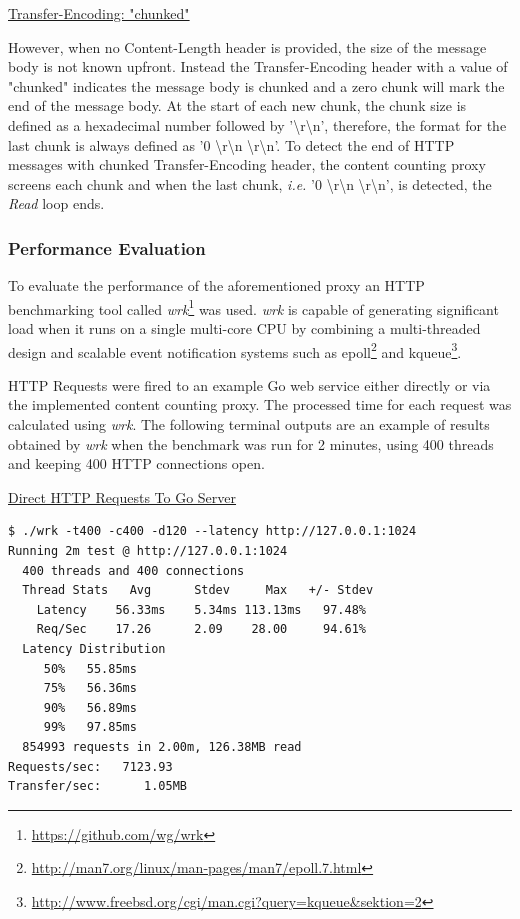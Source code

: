 \documentclass[a4paper,11pt,twoside]{report}
\begin{document}
\noindent
\underline{Transfer-Encoding: "chunked"}\medskip

\noindent
However, when no Content-Length header is provided, the size of the message body is not known upfront. Instead the Transfer-Encoding header with a value of "chunked" indicates the message body is chunked and a zero chunk will mark the end of the message body.  At the start of each new chunk, the chunk size is defined as a hexadecimal number followed by '\textbackslash r\textbackslash n', therefore, the format for the last chunk is always defined as '0 \textbackslash r\textbackslash n \textbackslash r\textbackslash n'. To detect the end of HTTP messages with chunked Transfer-Encoding header, the content counting proxy screens each chunk and when the last chunk, \textit{i.e.} '0 \textbackslash r\textbackslash n \textbackslash r\textbackslash n', is detected, the  \textit{Read} loop ends. 

\subsubsection*{Performance Evaluation}
To evaluate the performance of the aforementioned proxy an HTTP benchmarking tool called \textit{wrk}\footnote{\label{wrk} \url{https://github.com/wg/wrk}} was used. \textit{wrk} is capable of generating significant load when it runs on a single multi-core CPU by combining a multi-threaded design and scalable event notification systems such as epoll\footnote{\label{epoll} \url{http://man7.org/linux/man-pages/man7/epoll.7.html}} and kqueue\footnote{\label{kqueue} \url{http://www.freebsd.org/cgi/man.cgi?query=kqueue&sektion=2}}.



HTTP Requests were fired to an example Go web service either directly or via the implemented content counting proxy. The processed time for each request was calculated using \textit{wrk}. The following terminal outputs are an example of results obtained by \textit{wrk} when the benchmark was run for 2 minutes, using 400 threads and keeping 400 HTTP connections open. \bigskip  

\noindent
\underline{Direct HTTP Requests To Go Server}
\begin{lstlisting}[language=terminal]
$ ./wrk -t400 -c400 -d120 --latency http://127.0.0.1:1024
Running 2m test @ http://127.0.0.1:1024
  400 threads and 400 connections
  Thread Stats   Avg      Stdev     Max   +/- Stdev
    Latency    56.33ms    5.34ms 113.13ms   97.48%
    Req/Sec    17.26      2.09    28.00     94.61%
  Latency Distribution
     50%   55.85ms
     75%   56.36ms
     90%   56.89ms
     99%   97.85ms
  854993 requests in 2.00m, 126.38MB read
Requests/sec:   7123.93
Transfer/sec:      1.05MB
\end{lstlisting}
\end{document}
